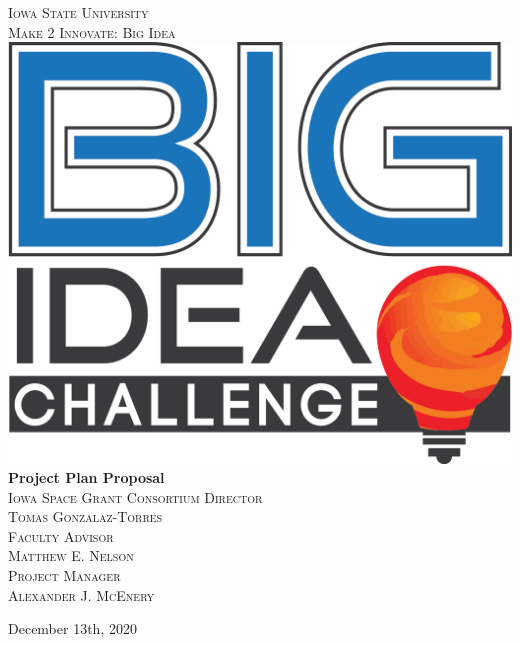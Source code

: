 \documentclass[10pt]{article}
\begin{document}
\begin{titlepage}
\centering
\textsc{\LARGE{Iowa State University}}\\[0.5 cm]
\textsc{\LARGE{Make 2 Innovate: Big Idea}}\\[0.7 cm]
\includegraphics[scale=0.25]{BigIdea.png}\\[0.35 cm]
\huge{\textbf{Project Plan Proposal}}\\[0.7 cm]%


\textsc{\large Iowa Space Grant Consortium Director \ \\ Tomas Gonzalaz-Torres}\\[0.5cm] %

\textsc{\Large Faculty Advisor \ \\ Matthew E. Nelson}\\[0.5cm] %

\textsc{\Large Project Manager \ \\ Alexander J. McEnery}\\[0.5cm]

\vspace{-0.25cm}


\vspace{-1.3cm}
\mbox{}\vfill\large{December 13th, 2020} %
\end{titlepage}

\newpage
\end{document}
